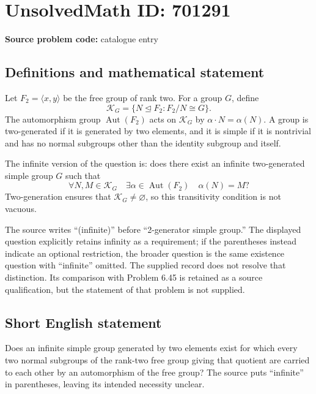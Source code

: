 \documentclass[11pt]{article}
\begin{document}
\section*{UnsolvedMath ID: 701291}
\textbf{Source problem code:} catalogue entry
\subsection{Definitions and mathematical statement}
Let \(F_2=\langle x,y\rangle\) be the free group of rank two. For a group \(G\), define
\[
\mathcal K_G=\{N\trianglelefteq F_2:F_2/N\cong G\}.
\]
The automorphism group \(\operatorname{Aut}(F_2)\) acts on \(\mathcal K_G\) by \(\alpha\cdot N=\alpha(N)\). A group is two-generated if it is generated by two elements, and it is simple if it is nontrivial and has no normal subgroups other than the identity subgroup and itself.

The infinite version of the question is: does there exist an infinite two-generated simple group \(G\) such that
\[
\forall N,M\in\mathcal K_G\quad\exists\alpha\in\operatorname{Aut}(F_2)\quad\alpha(N)=M?
\]
Two-generation ensures that \(\mathcal K_G\ne\varnothing\), so this transitivity condition is not vacuous.

The source writes ``(infinite)'' before ``2-generator simple group.'' The displayed question explicitly retains infinity as a requirement; if the parentheses instead indicate an optional restriction, the broader question is the same existence question with ``infinite'' omitted. The supplied record does not resolve that distinction. Its comparison with Problem 6.45 is retained as a source qualification, but the statement of that problem is not supplied.
\subsection{Short English statement}
Does an infinite simple group generated by two elements exist for which every two normal subgroups of the rank-two free group giving that quotient are carried to each other by an automorphism of the free group? The source puts ``infinite'' in parentheses, leaving its intended necessity unclear.
\end{document}
